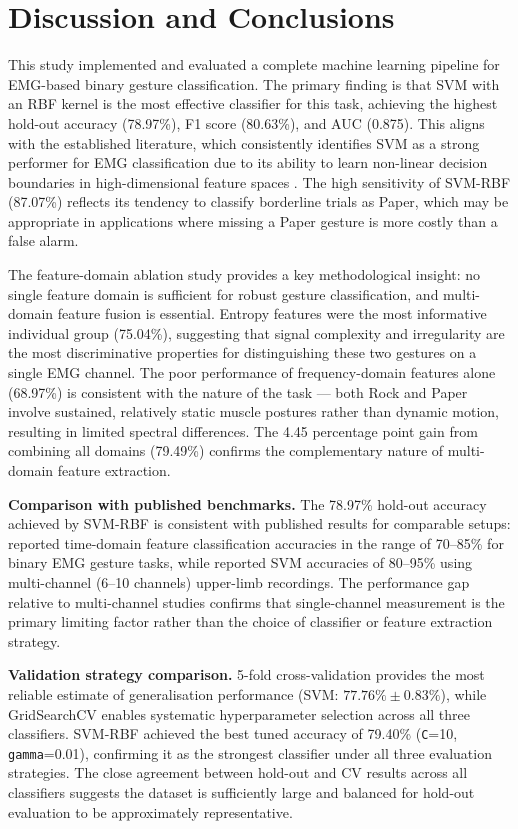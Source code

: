 \section{Discussion and Conclusions}

This study implemented and evaluated a complete machine learning pipeline for EMG-based binary
gesture classification. The primary finding is that SVM with an RBF kernel is the most effective
classifier for this task, achieving the highest hold-out accuracy (78.97\%), F1 score (80.63\%),
and AUC (0.875). This aligns with the established literature, which consistently identifies SVM
as a strong performer for EMG classification due to its ability to learn non-linear decision
boundaries in high-dimensional feature spaces \citep{Oskoei2007}. The high sensitivity of
SVM-RBF (87.07\%) reflects its tendency to classify borderline trials as Paper, which may be
appropriate in applications where missing a Paper gesture is more costly than a false alarm.

The feature-domain ablation study provides a key methodological insight: no single feature domain
is sufficient for robust gesture classification, and multi-domain feature fusion is essential.
Entropy features were the most informative individual group (75.04\%), suggesting that signal
complexity and irregularity are the most discriminative properties for distinguishing these two
gestures on a single EMG channel. The poor performance of frequency-domain features alone
(68.97\%) is consistent with the nature of the task --- both Rock and Paper involve sustained,
relatively static muscle postures rather than dynamic motion, resulting in limited spectral
differences. The 4.45 percentage point gain from combining all domains (79.49\%) confirms the
complementary nature of multi-domain feature extraction.

\textbf{Comparison with published benchmarks.}
The 78.97\% hold-out accuracy achieved by SVM-RBF is consistent with published results for
comparable setups: \citet{Phinyomark2012} reported time-domain feature classification accuracies
in the range of 70--85\% for binary EMG gesture tasks, while \citet{Oskoei2007} reported SVM
accuracies of 80--95\% using multi-channel (6--10 channels) upper-limb recordings. The
performance gap relative to multi-channel studies confirms that single-channel measurement is
the primary limiting factor rather than the choice of classifier or feature extraction strategy.

\textbf{Validation strategy comparison.}
5-fold cross-validation provides the most reliable estimate of generalisation performance
(SVM: $77.76\% \pm 0.83\%$), while GridSearchCV enables systematic hyperparameter selection
across all three classifiers. SVM-RBF achieved the best tuned accuracy of 79.40\%
(\texttt{C}=10, \texttt{gamma}=0.01), confirming it as the strongest classifier under all
three evaluation strategies. The close agreement between hold-out and CV results across
all classifiers suggests the dataset is sufficiently large and balanced for hold-out
evaluation to be approximately representative.

